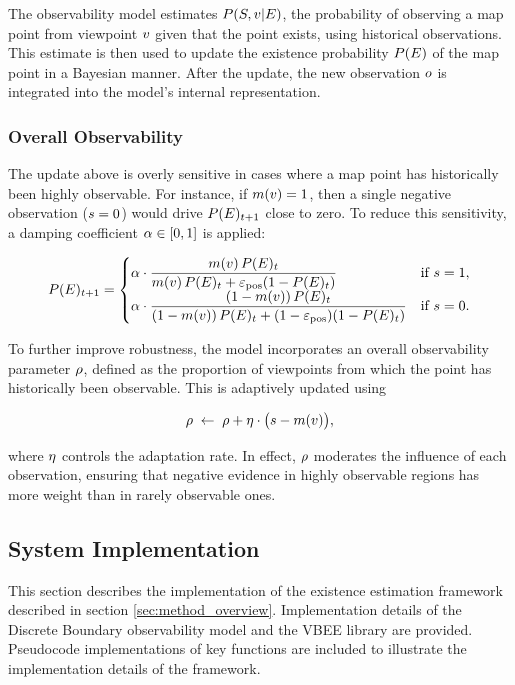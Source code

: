 The observability model estimates $P(S,v|E)$, the probability of observing a map point from viewpoint $v$ given that the point exists, using historical observations. This estimate is then used to update the existence probability $P(E)$ of the map point in a Bayesian manner. After the update, the new observation $o$ is integrated into the model's internal representation.

\subsubsection{Overall Observability}

The update above is overly sensitive in cases where a map point has historically been highly observable. For instance, if $m(v)=1$, then a single negative observation ($s=0$) would drive $P(E)_{t+1}$ close to zero. To reduce this sensitivity, a damping coefficient $\alpha \in [0,1]$ is applied:

\[
    P(E)_{t+1} =
    \begin{cases}
        \alpha \cdot \dfrac{m(v)\,P(E)_t}{m(v)\,P(E)_t + \varepsilon_{\text{pos}}(1-P(E)_t)}             & \text{if } s=1, \\[1.2ex]
        \alpha \cdot \dfrac{(1-m(v))\,P(E)_t}{(1-m(v))\,P(E)_t + (1-\varepsilon_{\text{pos}})(1-P(E)_t)} & \text{if } s=0.
    \end{cases}
\]

To further improve robustness, the model incorporates an overall observability parameter $\rho$, defined as the proportion of viewpoints from which the point has historically been observable. This is adaptively updated using

\[
    \rho \;\leftarrow\; \rho + \eta \cdot \big(s - m(v)\big),
\]

where $\eta$ controls the adaptation rate. In effect, $\rho$ moderates the influence of each observation, ensuring that negative evidence in highly observable regions has more weight than in rarely observable ones.

\subsection{System Implementation}

This section describes the implementation of the existence estimation framework described in section \ref{sec:method_overview}. Implementation details of the Discrete Boundary observability model and the VBEE library are provided. Pseudocode implementations of key functions are included to illustrate the implementation details of the framework.


